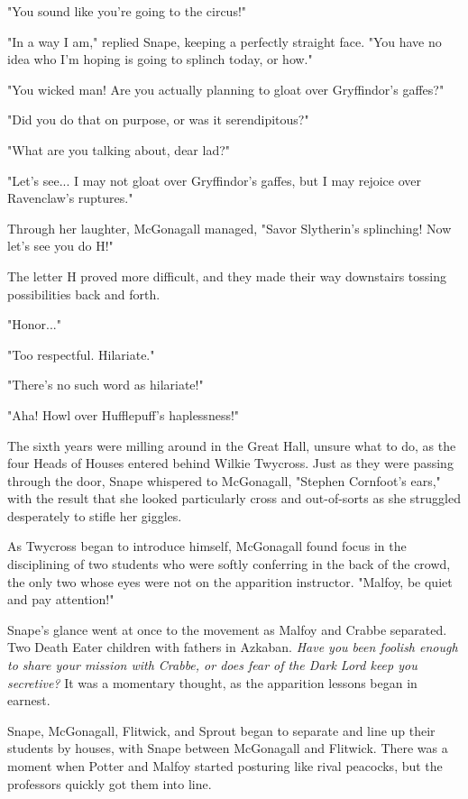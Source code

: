 \documentclass[a4paper,11pt]{article}
\begin{document}
"You sound like you're going to the circus!"

"In a way I am," replied Snape, keeping a perfectly straight face. "You have no idea who I'm hoping is going to splinch today, or how."

"You wicked man! Are you actually planning to gloat over Gryffindor's gaffes?"

"Did you do that on purpose, or was it serendipitous?"

"What are you talking about, dear lad?"

"Let's see... I may not gloat over Gryffindor's gaffes, but I may rejoice over Ravenclaw's ruptures."

Through her laughter, McGonagall managed, "Savor Slytherin's splinching! Now let's see you do H!"

The letter H proved more difficult, and they made their way downstairs tossing possibilities back and forth.

"Honor..."

"Too respectful. Hilariate."

"There's no such word as hilariate!"

"Aha! Howl over Hufflepuff's haplessness!"

The sixth years were milling around in the Great Hall, unsure what to do, as the four Heads of Houses entered behind Wilkie Twycross. Just as they were passing through the door, Snape whispered to McGonagall, "Stephen Cornfoot's ears," with the result that she looked particularly cross and out-of-sorts as she struggled desperately to stifle her giggles.

As Twycross began to introduce himself, McGonagall found focus in the disciplining of two students who were softly conferring in the back of the crowd, the only two whose eyes were not on the apparition instructor. "Malfoy, be quiet and pay attention!"

Snape's glance went at once to the movement as Malfoy and Crabbe separated. Two Death Eater children with fathers in Azkaban. \emph{Have you been foolish enough to share your mission with Crabbe, or does fear of the Dark Lord keep you secretive?} It was a momentary thought, as the apparition lessons began in earnest.

Snape, McGonagall, Flitwick, and Sprout began to separate and line up their students by houses, with Snape between McGonagall and Flitwick. There was a moment when Potter and Malfoy started posturing like rival peacocks, but the professors quickly got them into line.
\end{document}
